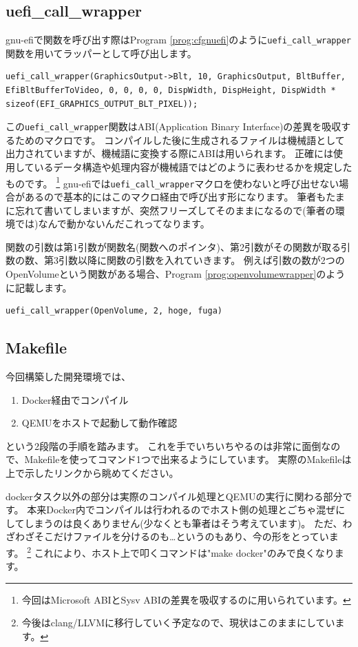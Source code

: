 \documentclass[10pt,b5paper,twoside,openany]{ltjsbook}
\begin{document}
\subsection{uefi\_call\_wrapper}
gnu-efiで関数を呼び出す際はProgram \ref{prog:cfgnuefi}のように\verb+uefi_call_wrapper+関数を用いてラッパーとして呼び出します。
\begin{lstlisting}[style=customC,caption=call function with gnu-efi,label=prog:cfgnuefi]
uefi_call_wrapper(GraphicsOutput->Blt, 10, GraphicsOutput, BltBuffer, EfiBltBufferToVideo, 0, 0, 0, 0, DispWidth, DispHeight, DispWidth * sizeof(EFI_GRAPHICS_OUTPUT_BLT_PIXEL));
\end{lstlisting}
この\verb+uefi_call_wrapper+関数はABI(Application Binary Interface)の差異を吸収するためのマクロです。
コンパイルした後に生成されるファイルは機械語として出力されていますが、機械語に変換する際にABIは用いられます。
正確には使用しているデータ構造や処理内容が機械語ではどのように表わせるかを規定したものです。
\footnote{今回はMicrosoft ABIとSysv ABIの差異を吸収するのに用いられています。}
gnu-efiでは\verb+uefi_call_wrapper+マクロを使わないと呼び出せない場合があるので基本的にはこのマクロ経由で呼び出す形になります。
筆者もたまに忘れて書いてしまいますが、突然フリーズしてそのままになるので(筆者の環境では)なんで動かないんだこれってなります。

関数の引数は第1引数が関数名(関数へのポインタ)、第2引数がその関数が取る引数の数、第3引数以降に関数の引数を入れていきます。
例えば引数の数が2つのOpenVolumeという関数がある場合、Program \ref{prog:openvolumewrapper}のように記載します。
\begin{lstlisting}[style=customC,caption=OpenVolume with uefi\_call\_wrapper,label=prog:openvolumewrapper]
uefi_call_wrapper(OpenVolume, 2, hoge, fuga)
\end{lstlisting}

\subsection{Makefile}
今回構築した開発環境では、
\begin{enumerate}
    \item Docker経由でコンパイル
    \item QEMUをホストで起動して動作確認
\end{enumerate}
という2段階の手順を踏みます。
これを手でいちいちやるのは非常に面倒なので、Makefileを使ってコマンド1つで出来るようにしています。
実際のMakefileは上で示したリンクから眺めてください。

dockerタスク以外の部分は実際のコンパイル処理とQEMUの実行に関わる部分です。
本来Docker内でコンパイルは行われるのでホスト側の処理とごちゃ混ぜにしてしまうのは良くありません(少なくとも筆者はそう考えています)。
ただ、わざわざそこだけファイルを分けるのも…というのもあり、今の形をとっています。
\footnote{今後はclang/LLVMに移行していく予定なので、現状はこのままにしています。}
これにより、ホスト上で叩くコマンドは"make docker"のみで良くなります。
\end{document}
